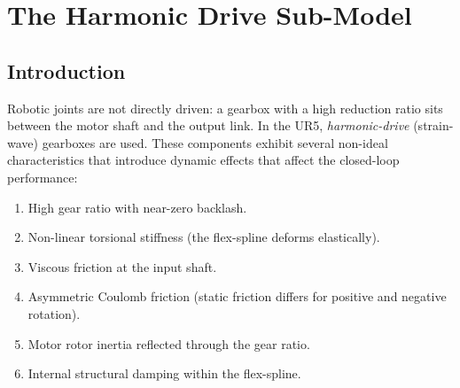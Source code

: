 \chapter{The Harmonic Drive Sub-Model}
\label{chap:harmonic}

\section{Introduction}

Robotic joints are not directly driven: a gearbox with a high reduction ratio sits between the motor shaft and the output link.
In the UR5, \emph{harmonic-drive} (strain-wave) gearboxes are used.
These components exhibit several non-ideal characteristics that introduce dynamic effects that affect the closed-loop performance:
\begin{enumerate}
  \item High gear ratio with near-zero backlash.
  \item Non-linear torsional stiffness (the flex-spline deforms elastically).
  \item Viscous friction at the input shaft.
  \item Asymmetric Coulomb friction (static friction differs for positive and negative rotation).
  \item Motor rotor inertia reflected through the gear ratio.
  \item Internal structural damping within the flex-spline.
\end{enumerate}


